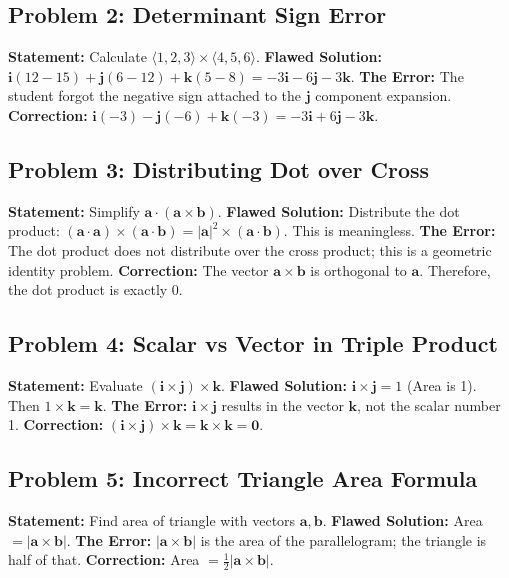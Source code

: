 \documentclass[11pt]{article}
\renewcommand{\vec}[1]{\mathbf{#1}}
\newcommand{\ihat}{\mathbf{i}}
\newcommand{\jhat}{\mathbf{j}}
\newcommand{\khat}{\mathbf{k}}
\begin{document}
\subsection{Problem 2: Determinant Sign Error}
\textbf{Statement:} Calculate $\langle 1, 2, 3 \rangle \times \langle 4, 5, 6 \rangle$.
\textbf{Flawed Solution:}
$\ihat(12-15) + \jhat(6-12) + \khat(5-8) = -3\ihat - 6\jhat - 3\khat$.
\textbf{The Error:} The student forgot the negative sign attached to the $\jhat$ component expansion.
\textbf{Correction:} $\ihat(-3) - \jhat(-6) + \khat(-3) = -3\ihat + 6\jhat - 3\khat$.

\subsection{Problem 3: Distributing Dot over Cross}
\textbf{Statement:} Simplify $\vec{a} \cdot (\vec{a} \times \vec{b})$.
\textbf{Flawed Solution:} Distribute the dot product: $(\vec{a} \cdot \vec{a}) \times (\vec{a} \cdot \vec{b}) = |\vec{a}|^2 \times (\vec{a} \cdot \vec{b})$. This is meaningless.
\textbf{The Error:} The dot product does not distribute over the cross product; this is a geometric identity problem.
\textbf{Correction:} The vector $\vec{a} \times \vec{b}$ is orthogonal to $\vec{a}$. Therefore, the dot product is exactly 0.

\subsection{Problem 4: Scalar vs Vector in Triple Product}
\textbf{Statement:} Evaluate $(\ihat \times \jhat) \times \khat$.
\textbf{Flawed Solution:} $\ihat \times \jhat = 1$ (Area is 1). Then $1 \times \khat = \khat$.
\textbf{The Error:} $\ihat \times \jhat$ results in the vector $\khat$, not the scalar number 1.
\textbf{Correction:} $(\ihat \times \jhat) \times \khat = \khat \times \khat = \vec{0}$.

\subsection{Problem 5: Incorrect Triangle Area Formula}
\textbf{Statement:} Find area of triangle with vectors $\vec{a}, \vec{b}$.
\textbf{Flawed Solution:} Area $= |\vec{a} \times \vec{b}|$.
\textbf{The Error:} $|\vec{a} \times \vec{b}|$ is the area of the parallelogram; the triangle is half of that.
\textbf{Correction:} Area $= \frac{1}{2}|\vec{a} \times \vec{b}|$.
\end{document}
